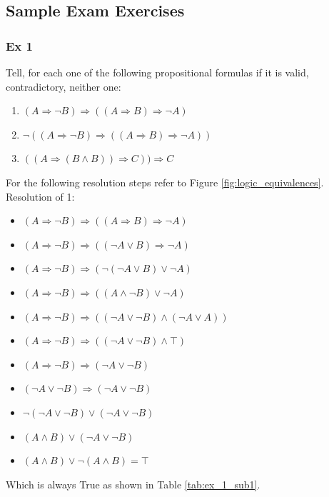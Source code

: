 \documentclass[10pt,a4paper]{article}
\begin{document}
\begin{enumerate}
\vfill

\subsection{Sample Exam Exercises}

\subsubsection{Ex 1}
Tell, for each one of the following propositional formulas if it is valid, contradictory, neither one:
\begin{enumerate}
\item $(A\Rightarrow \neg B)\Rightarrow((A\Rightarrow B)\Rightarrow \neg A)$
\item $\neg ((A\Rightarrow \neg B)\Rightarrow ((A\Rightarrow B)\Rightarrow \neg A))$
\item $((A\Rightarrow (B\wedge B))\Rightarrow C))\Rightarrow C$
\end{enumerate}
For the following resolution steps refer to Figure \ref{fig:logic_equivalences}.\\
Resolution of 1:
\begin{itemize}
\item $(A\Rightarrow \neg B)\Rightarrow((A\Rightarrow B)\Rightarrow \neg A)$
\item $(A\Rightarrow \neg B)\Rightarrow((\neg A\vee B)\Rightarrow \neg A)$
\item $(A\Rightarrow \neg B)\Rightarrow(\neg (\neg A\vee B)\vee \neg A)$
\item $(A\Rightarrow \neg B)\Rightarrow((A \wedge \neg B)\vee \neg A)$
\item $(A\Rightarrow \neg B)\Rightarrow((\neg A \vee \neg B)\wedge (\neg A \vee A))$
\item $(A\Rightarrow \neg B)\Rightarrow((\neg A \vee \neg B)\wedge \top)$
\item $(A\Rightarrow \neg B)\Rightarrow(\neg A \vee \neg B)$
\item $(\neg A\vee \neg B)\Rightarrow(\neg A \vee \neg B)$
\item $\neg (\neg A\vee \neg B)\vee (\neg A \vee \neg B)$
\item $ ( A \wedge B) \vee (\neg A \vee \neg B)$
\item $ ( A \wedge B) \vee \neg ( A \wedge  B)=\top$
\end{itemize}
Which is always True as shown in Table \ref{tab:ex_1_sub1}.\\


\end{enumerate}
\end{document}
